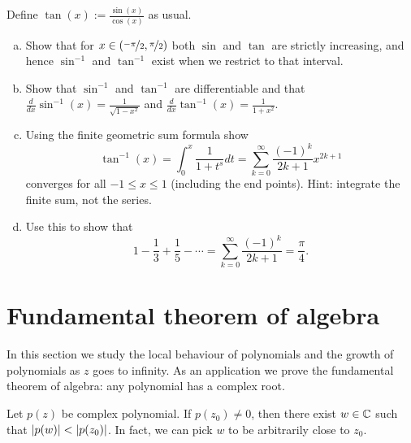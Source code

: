\begin{exercise}
Define $\tan(x) := \frac{\sin(x)}{\cos(x)}$ as usual.
\begin{enumerate}[a)]
\item
Show that for $x \in (\nicefrac{-\pi}{2},\nicefrac{\pi}{2})$
both $\sin$ and $\tan$ are strictly increasing, and hence $\sin^{-1}$
and $\tan^{-1}$ exist when we restrict to that interval.
\item
Show that $\sin^{-1}$ and $\tan^{-1}$ are differentiable
and
that
$\frac{d}{dx} \sin^{-1}(x) = \frac{1}{\sqrt{1-x^2}}$ and
$\frac{d}{dx} \tan^{-1}(x) = \frac{1}{1+x^2}$.
\item
Using the finite geometric sum formula show
\begin{equation*}
\tan^{-1}(x) = \int_0^x \frac{1}{1+t^s} dt
=
\sum_{k=0}^\infty \frac{{(-1)}^k}{2k+1} x^{2k+1}
\end{equation*}
converges for all $-1 \leq x \leq 1$ (including the end points).
Hint: integrate the finite sum, not the series.
\item
Use this to show that
\begin{equation*}
1 - \frac{1}{3} + \frac{1}{5} - \cdots
=
\sum_{k=0}^\infty \frac{{(-1)}^k}{2k+1}
=
\frac{\pi}{4} .
\end{equation*}
\end{enumerate}
\end{exercise}


\sectionnewpage
\section{Fundamental theorem of algebra}
\label{sec:fundalgeb}


In this section we study the local behaviour of polynomials
and the growth of polynomials as $z$ goes to infinity.  As an application
we prove the fundamental theorem of algebra: any polynomial
has a complex root.

\begin{lemma} \label{lemma:polyalwaysgetssmaller}
Let $p(z)$ be complex polynomial.  If $p(z_0) \not= 0$, then there
exist $w \in {\mathbb{C}}$ such that $\lvert {p(w)} \rvert < \lvert {p(z_0)} \rvert$.  In fact,
we can pick $w$ to be arbitrarily close to $z_0$.
\end{lemma}

